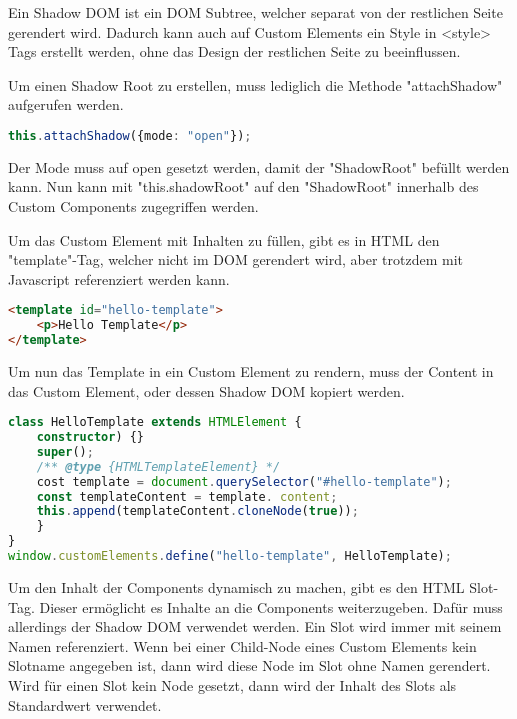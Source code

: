 
Ein Shadow DOM ist ein DOM Subtree, welcher separat von der restlichen Seite gerendert wird. Dadurch kann auch auf Custom Elements ein Style in <style> Tags erstellt werden, ohne das Design der restlichen Seite zu beeinflussen.

Um einen Shadow Root zu erstellen, muss lediglich die Methode "attachShadow" aufgerufen werden. 

\begin{lstlisting}[language=TypeScript,caption={Erstellung eines Shadow Roots}]
this.attachShadow({mode: "open"});
\end{lstlisting}

Der Mode muss auf open gesetzt werden, damit der "ShadowRoot" befüllt werden kann. Nun kann mit "this.shadowRoot" auf den "ShadowRoot" innerhalb des Custom Components zugegriffen werden.

\cite{MDNShadowRoot}


Um das Custom Element mit Inhalten zu füllen, gibt es in HTML den "template"-Tag, welcher nicht im DOM gerendert wird, aber trotzdem mit Javascript referenziert werden kann. 

\begin{lstlisting}[language=HTML,caption={Erstellung eines HTML Templates}]
<template id="hello-template">
    <p>Hello Template</p>
</template>
\end{lstlisting}

Um nun das Template in ein Custom Element zu rendern, muss der Content in das Custom Element, oder dessen Shadow DOM kopiert werden.

\begin{lstlisting}[language=TypeScript,caption={Kopieren des Templates in das Custom Element}]
class HelloTemplate extends HTMLElement {
    constructor) {}
    super();
    /** @type {HTMLTemplateElement} */
    cost template = document.querySelector("#hello-template");
    const templateContent = template. content;
    this.append(templateContent.cloneNode(true));
    }
}
window.customElements.define("hello-template", HelloTemplate);
\end{lstlisting}

Um den Inhalt der Components dynamisch zu machen, gibt es den HTML Slot-Tag. Dieser ermöglicht es Inhalte an die Components weiterzugeben. Dafür muss allerdings der Shadow DOM verwendet werden. Ein Slot wird immer mit seinem Namen referenziert. Wenn bei einer Child-Node eines Custom Elements kein Slotname angegeben ist, dann wird diese Node im Slot ohne Namen gerendert. Wird für einen Slot kein Node gesetzt, dann wird der Inhalt des Slots als Standardwert verwendet. 

